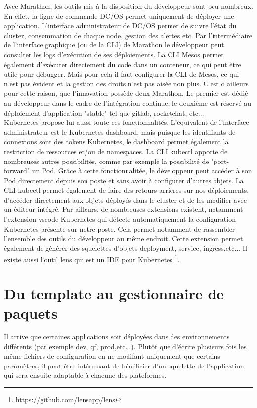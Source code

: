 \documentclass[11pt,fleqn]{book} %
\begin{document}
Avec Marathon, les outils mis à la disposition du développeur sont peu nombreux. En effet, la ligne de commande DC/OS permet uniquement de déployer une application. L'interface administrateur de DC/OS permet de suivre l'état du cluster, consommation de chaque node, gestion des alertes etc. Par l'intermédiaire de l'interface graphique (ou de la CLI) de Marathon le développeur peut consulter les logs d'exécution de ses déploiements. La CLI Mesos permet également d'exécuter directement du code dans un conteneur, ce qui peut être utile pour débugger. Mais pour cela il faut configurer la CLI de Mesos, ce qui n'est pas évident et la gestion des droits n'est pas aisée non plus. C'est d'ailleurs pour cette raison, que l'innovation possède deux Marathon. Le premier est dédié au développeur dans le cadre de l'intégration continue, le deuxième est réservé au déploiement d'application "stable" tel que gitlab, rocketchat, etc... \\

Kubernetes propose lui aussi toute ces fonctionnalités. L'équivalent de l'interface administrateur est le Kubernetes dashboard, mais puisque les identifiants de connexions sont des tokens Kubernetes, le dashboard permet également la restriction de ressources et/ou de namespaces. La CLI kubectl apporte de nombreuses autres possibilités, comme par exemple la possibilité de "port-forward" un Pod. Grâce à cette fonctionnalitée, le développeur peut accéder à son Pod directement depuis son poste et sans avoir à configurer d'autres objets. La CLI kubectl permet également de faire des retours arrières sur nos déploiements, d'accéder directement aux objets déployés dans le cluster et de les modifier avec un éditeur intégré. Par ailleurs, de nombreuses extensions existent, notamment l'extension vscode Kubernetes qui détecte automatiquement la configuration Kubernetes présente sur notre poste. Cela permet notamment de rassembler l'ensemble des outils du développeur au même endroit. Cette extension permet également de générer des squelettes d'objets deployment, service, ingress,etc... Il existe aussi l'outil lens qui est un IDE pour Kubernetes \footnote{\url{
https://github.com/lensapp/lens}}.

\section{Du template au gestionnaire de paquets}
Il arrive que certaines applications soit déployées dans des environnements différents (par exemple dev, qf, prod,etc...). Plutôt que d'écrire plusieurs fois les même fichiers de configuration en ne modifant uniquement que certains paramètres, il peut être intéressant de bénéficier d'un squelette de l'application qui sera ensuite adaptable à chacune des plateformes.
\end{document}
